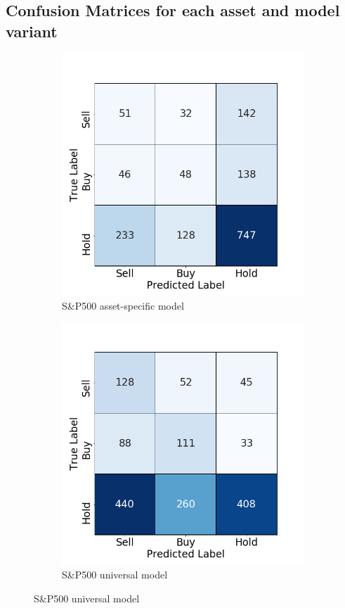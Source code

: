 \documentclass[12pt, a4paper]{article}
\begin{document}
\subsection{Confusion Matrices for each asset and model variant}
\label{subsec:App:CMs}

\begin{figure}[H]

\begin{subfigure}{.5\textwidth}
  \centering
  \includegraphics[width=.75\linewidth]{images/CMs/CM_indiv_GSPC.png}  
  \caption{S\&P500 asset-specific model}
  \label{fig:subGSPCI}
\end{subfigure}
\begin{subfigure}{.5\textwidth}
  \centering
  \includegraphics[width=.75\linewidth]{images/CMs/CM_univ_GSPC.png}  
  \caption{S\&P500 universal model}
  \label{fig:subGSPCU}
\end{subfigure}


\end{figure}
\end{document}
